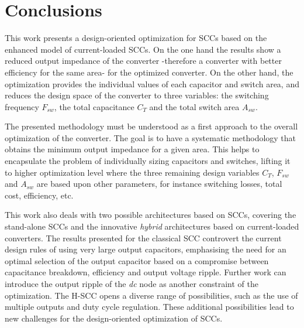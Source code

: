 \section{Conclusions}
This work presents a design-oriented optimization for SCCs based on the enhanced model of current-loaded SCCs. On the one hand the results show a reduced output impedance of the converter -therefore a converter with better efficiency for the same area- for the optimized converter. On the other hand, the optimization provides the individual values of each capacitor and switch area, and reduces the design space of the converter to three variables: the switching frequency $F_{sw}$, the total capacitance $C_T$  and the total switch area $A_{sw}$.

The presented methodology must be understood as a first approach to the overall optimization of the converter. The goal is to have a systematic methodology that obtains the minimum output impedance for a given area. This helps to encapsulate the problem of individually sizing capacitors and switches, lifting it to higher optimization level where the three remaining design variables $C_T$, $F_{sw}$ and $A_{sw}$ are based upon other parameters, for instance switching losses, total cost, efficiency, etc.

This work also deals with two possible architectures based on SCCs, covering the stand-alone SCCs and the innovative \emph{hybrid} architectures based on current-loaded converters. The results presented for the classical SCC controvert the current design rules of using very large output capacitors, emphasising the need for an optimal selection of the output capacitor based on a compromise between capacitance breakdown, efficiency and output voltage ripple. Further work can introduce the output ripple of the \emph{dc}  node as another constraint of the optimization. The H-SCC opens a diverse range of possibilities, such as the use of multiple outputs and duty cycle regulation. These additional possibilities lead to new challenges for the design-oriented optimization of SCCs.


%
%
%
%


